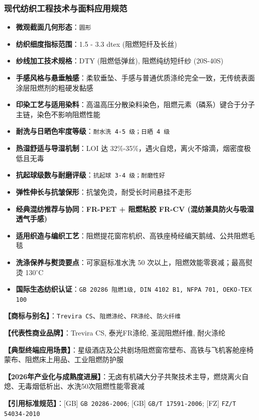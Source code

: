 \documentclass[11pt,openright,twoside,UTF8]{ctexbook}
\begin{document}
\subsubsection*{现代纺织工程技术与面料应用规范}
\begin{itemize} \setlength{\itemsep}{2pt}
    \item \textbf{微观截面几何形态}：\texttt{圆形}
    \item \textbf{纺织细度指标范围}：1.5 - 3.3 dtex (阻燃短纤及长丝)
    \item \textbf{纱线加工技术规格}：DTY (阻燃低弹丝), 阻燃纯纺短纤纱 (20S-40S)
    \item \textbf{手感风格与悬垂触感}：柔软垂坠、手感与普通优质涤纶完全一致，无传统表面涂层阻燃剂的粗硬发黏感
    \item \textbf{印染工艺与适用染料}：高温高压分散染料染色，阻燃元素（磷系）键合于分子主链，染色不影响阻燃性能
    \item \textbf{耐洗与日晒色牢度等级}：\texttt{耐水洗 4-5 级；日晒 4 级}
    \item \textbf{热湿舒适与导湿机制}：LOI 达 32\%-35\%，遇火自熄，离火不熔滴，烟密度极低且无毒
    \item \textbf{抗起球级数与耐磨评级}：\texttt{抗起球 3-4 级；耐磨性好}
    \item \textbf{弹性伸长与抗皱保形}：抗皱免烫，耐受长时间悬挂不走形
    \item \textbf{经典混纺推荐与协同}：\textbf{FR-PET + 阻燃粘胶 FR-CV (混纺兼具防火与吸湿透气手感)}
    \item \textbf{适用织造与编织工艺}：阻燃提花窗帘机织、高铁座椅经编天鹅绒、公共阻燃毛毯
    \item \textbf{洗涤保养与熨烫要点}：可家庭标准水洗 50 次以上，阻燃效能零衰减；最高熨烫 130$^\circ\mathrm{C}$
    \item \textbf{国际生态纺织认证}：\texttt{GB 20286 阻燃1级, DIN 4102 B1, NFPA 701, OEKO-TEX 100}
\end{itemize}
\vspace{0.2cm}

\noindent\textbf{【商标与别名】}：\texttt{Trevira CS}、\texttt{阻燃涤纶}、\texttt{FR涤纶}、\texttt{防火纤维}\par
\noindent\textbf{【代表性商业品牌】}：Trevira CS, 泰光FR涤纶, 圣润阻燃纤维, 耐火涤纶\par
\noindent\textbf{【典型终端应用场景】}：星级酒店及公共剧场阻燃窗帘壁布、高铁与飞机客舱座椅蒙布、阻燃床上用品、工业阻燃防护服\par
\noindent\textbf{【2026年产业化与成熟度进展】}：无卤有机磷大分子共聚技术主导，燃烧离火自熄、无毒烟低析出、水洗50次阻燃性能零衰减\par
\noindent\textbf{【引用标准规范】}：[GB] \texttt{GB 20286-2006}; [GB] \texttt{GB/T 17591-2006}; [FZ] \texttt{FZ/T 54034-2010}\par
\vspace{0.5cm}
\end{document}

